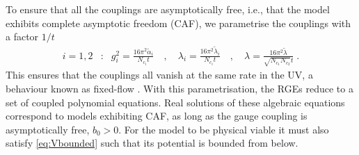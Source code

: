 To ensure that all the couplings are asymptotically free, i.e., that the model exhibits complete asymptotic freedom (CAF), we parametrise the couplings with a factor $1/t$ 
\begin{align}
i=1,2&:&g_i^2=\frac{16\pi^2\tilde\alpha_i}{N_{c_i}t}\quad,\quad \lambda_i=\frac{16\pi^2\tilde\lambda_i}{N_{c_i}t}\quad,\quad\lambda=\frac{16\pi^2\tilde\lambda}{\sqrt{N_{c_1}N_{c_2}}t}\;.
\end{align}
This ensures that the couplings all vanish at the same rate in the UV, a behaviour known as fixed-flow \cite{Giudice:2015}. With this parametrisation, the RGEs reduce to a set of coupled polynomial equations. Real solutions of these algebraic equations correspond to models exhibiting CAF, as long as the gauge coupling is asymptotically free, $b_0>0$. For the model to be physical viable it must also satisfy \eqref{eq:Vbounded} such that its potential is bounded from below. 


